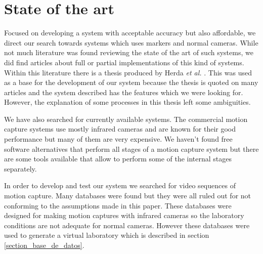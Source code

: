 \section{State of the art}\label{estadoDelArte}

Focused on developing a system with acceptable accuracy but also affordable, we direct our search towards systems which uses markers and normal cameras. While not much literature was found reviewing the state of the art of such systems, we did find articles about full or partial implementations of this kind of systems. Within this literature there is a thesis produced by Herda \textit{et al.} \cite{herda}. This was used as a base for the development of our system because the thesis is quoted on many articles and the system described has the features which we were looking for. However, the explanation of some processes in this thesis left some ambiguities.

We have also searched for currently available systems. The commercial motion capture systems use mostly infrared cameras and are known for their good performance but many of them are very expensive. We haven't found free software alternatives that perform all stages of a motion capture system but there are some tools available that allow to perform some of the internal stages separately.

In order to develop and test our system we searched for video sequences of motion capture. Many databases were found but they were all ruled out for not conforming to the assumptions made in this paper. These databases were designed for making motion captures with infrared cameras so the laboratory conditions are not adequate for normal cameras. However these databases were used to generate a virtual laboratory which is described in section \ref{section_base_de_datos}.



